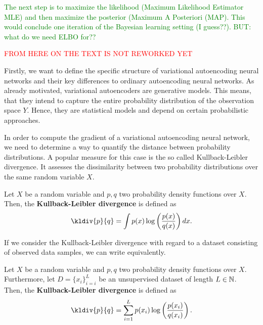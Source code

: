 \textcolor{green}{The next step is to maximize the likelihood (Maximum Likelihood Estimator MLE) and then maximize the posterior (Maximum A Posteriori (MAP). This would conclude one iteration of the Bayesian learning setting (I guess??). BUT: what do we need ELBO for??}


\textcolor{red}{FROM HERE ON THE TEXT IS NOT REWORKED YET}

Firstly, we want to define the specific structure of variational autoencoding neural networks and their key differences to ordinary autoencoding neural networks. As already motivated, variational autoencoders are generative models. This means, that they intend to capture the entire probability distribution of the observation space $Y$. Hence, they are statistical models and depend on certain probabilistic approaches.










In order to compute the gradient of a variational autoencoding neural network, we need to determine a way to quantify the distance between probability distributions. A popular measure for this case is the so called Kullback-Leibler divergence. It assesses the dissimilarity between two probability distributions over the same 	random variable $X$.
\begin{definition}\label{def_kl_div}
Let $X$ be a random variable and $p, q$ two probability density functions over $X$. Then, the \textbf{Kullback-Leibler divergence} is defined as
\begin{align}
\kldiv{p}{q} = \int p(x) \log \left( \frac{p(x)}{q(x)}\right) dx.
\end{align}
\end{definition}

If we consider the Kullback-Leibler divergence with regard to a dataset consisting of observed data samples, we can write equivalently.

\begin{definition}
Let $X$ be a random variable and $p, q$ two probability density functions over $X$. Furthermore, let $D=\{x_i\}_{i=i}^L$ be an unsupervised dataset of length $L\in\operatorname{\mathbb{N}}$.\\
Then, the \textbf{Kullback-Leibler divergence} is defined as
\begin{align}
\kldiv{p}{q} = \sum_{i=1}^L p(x_i) \log \left( \frac{p(x_i)}{q(x_i)}\right).
\end{align}
\end{definition}

